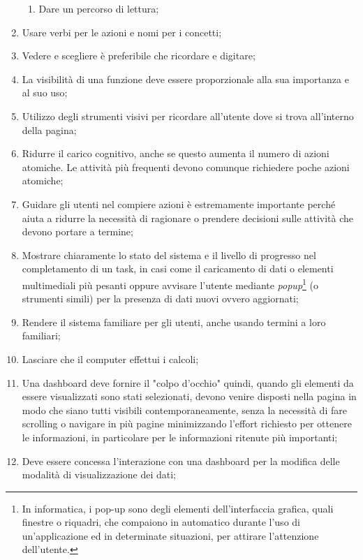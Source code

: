 \begin{enumerate}
\begin{enumerate}
        \item Dare un percorso di lettura;
    \end{enumerate}
    \item Usare verbi per le azioni e nomi per i concetti; \label{lg:6}
    \item Vedere e scegliere è preferibile che ricordare e digitare;\label{lg:7}
    \item La visibilità di una funzione deve essere proporzionale alla sua importanza e al suo uso;\label{lg:8}
    \item Utilizzo degli strumenti visivi per ricordare all'utente dove si trova all'interno della pagina;\label{lg:9}
    \item Ridurre il carico cognitivo, anche se questo aumenta il numero di azioni atomiche. Le attività più frequenti devono comunque richiedere poche azioni atomiche;\label{lg:10}
    \item Guidare gli utenti nel compiere azioni è estremamente importante perché aiuta a ridurre la necessità di ragionare o prendere decisioni sulle attività che devono portare a termine;\label{lg:11}
    \item Mostrare chiaramente lo stato del sistema e il livello di progresso nel completamento di un task, in casi come il caricamento di dati o elementi multimediali più pesanti oppure avvisare l'utente mediante \textit{popup}\footnote{In informatica, i pop-up sono degli elementi dell'interfaccia grafica, quali finestre o riquadri, che compaiono in automatico durante l'uso di un'applicazione ed in determinate situazioni, per attirare l'attenzione dell'utente.} (o strumenti simili) per la presenza di dati nuovi ovvero aggiornati;\label{lg:12}
    \item Rendere il sistema familiare per gli utenti, anche usando termini a loro familiari;\label{lg:13}
    \item Lasciare che il computer effettui i calcoli;\label{lg:14}
    \item Una dashboard deve fornire il "colpo d'occhio" quindi, quando gli elementi da essere visualizzati sono stati selezionati, devono venire disposti nella pagina in modo che siano tutti visibili contemporaneamente, senza la necessità di fare scrolling o navigare in più pagine minimizzando l'effort richiesto per ottenere le informazioni, in particolare per le informazioni ritenute più importanti;\label{lg:15}
    \item Deve essere concessa l'interazione con una dashboard per la modifica delle modalità di visualizzazione dei dati;\label{lg:16}

\end{enumerate}
